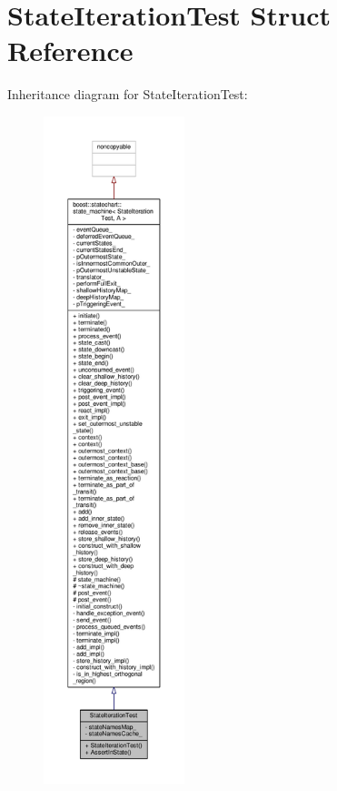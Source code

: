 \hypertarget{struct_state_iteration_test}{}\section{State\+Iteration\+Test Struct Reference}
\label{struct_state_iteration_test}


Inheritance diagram for State\+Iteration\+Test\+:
\nopagebreak
\begin{figure}[H]
\begin{center}
\leavevmode
\includegraphics[height=550pt]{struct_state_iteration_test__inherit__graph}
\end{center}
\end{figure}


